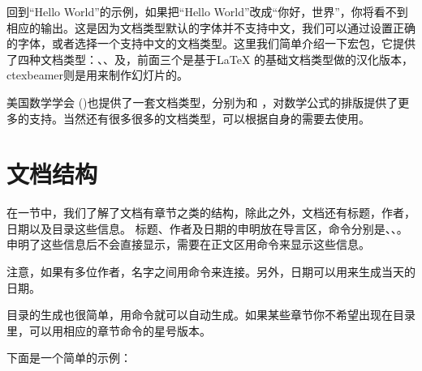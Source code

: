 回到``Hello World''的示例，如果把“Hello
World”改成“你好，世界”，你将看不到相应的输出。这是因为文档类型默认的字体并不支持中文，我们可以通过设置正确的字体，或者选择一个支持中文的文档类型。这里我们简单介绍一下宏包，它提供了四种文档类型：、、及，前面三个是基于\LaTeX
的基础文档类型做的汉化版本，ctexbeamer则是用来制作幻灯片的。

美国数学学会 (\AmS)也提供了一套文档类型，分别为和 ，对数学公式的排版提供了更多的支持。当然还有很多很多的文档类型，可以根据自身的需要去使用。

\section{文档结构}
在一节中，我们了解了文档有章节之类的结构，除此之外，文档还有标题，作者，日期以及目录这些信息。
标题、作者及日期的申明放在导言区，命令分别是\texinline{\title}、\texinline{\author}、\texinline{\date}。申明了这些信息后不会直接显示，需要在正文区用\texinline{\maketitle}命令来显示这些信息。

注意，如果有多位作者，名字之间用\texinline{\and}命令来连接。另外，日期可以用\texinline{\today}来生成当天的日期。

目录的生成也很简单，用\texinline{\tableofcontents}命令就可以自动生成。如果某些章节你不希望出现在目录里，可以用相应的章节命令的星号版本。

下面是一个简单的示例：

